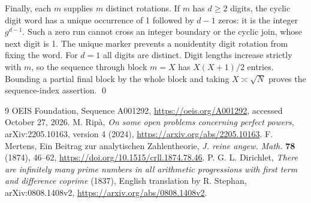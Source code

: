 \documentclass[10pt]{article}
\begin{document}
Finally, each $m$ supplies $m$ distinct rotations. If $m$ has $d\ge2$ digits,
the cyclic digit word has a unique occurrence of 1 followed by $d-1$ zeros:
it is the integer $g^{d-1}$. Such a zero run cannot cross an integer boundary
or the cyclic join, whose next digit is 1. The unique marker prevents a
nonidentity digit rotation from fixing the word. For $d=1$ all digits are distinct.
Digit lengths increase strictly with $m$, so the sequence through block $m=X$
has $X(X+1)/2$ entries. Bounding a partial final block by the whole block
and taking $X\asymp\sqrt N$ proves the sequence-index assertion.
\qed

\begin{thebibliography}{9}
 OEIS Foundation, Sequence A001292,
\url{https://oeis.org/A001292}, accessed October 27, 2026.
 M. Rip\`a, \emph{On some open problems concerning perfect powers},
arXiv:2205.10163, version 4 (2024), \url{https://arxiv.org/abs/2205.10163}.
 F. Mertens, Ein Beitrag zur analytischen Zahlentheorie,
\emph{J. reine angew. Math.} \textbf{78} (1874), 46--62,
\url{https://doi.org/10.1515/crll.1874.78.46}.
 P. G. L. Dirichlet,
\emph{There are infinitely many prime numbers in all arithmetic progressions
with first term and difference coprime} (1837),
English translation by R. Stephan, arXiv:0808.1408v2,
\url{https://arxiv.org/abs/0808.1408v2}.
\end{thebibliography}
\end{document}
